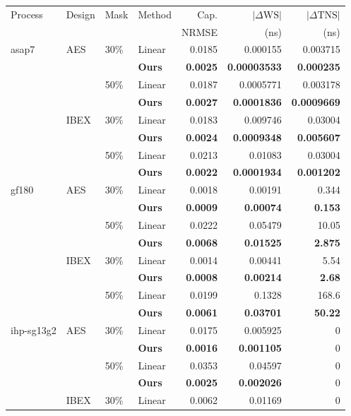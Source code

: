 \footnotesize
\setlength{\tabcolsep}{1.5pt}
\renewcommand{\arraystretch}{0.98}
\begin{tabular*}{\linewidth}{@{\extracolsep{\fill}}llllrrr@{}}\toprule
Process & Design & Mask & Method & Cap.  & $|\Delta\mathrm{WS}|$ & $|\Delta\mathrm{TNS}|$ \\
 & & & & NRMSE & (ns) & (ns) \\
\midrule
asap7 & AES & 30\% & Linear & 0.0185 & 0.000155 & 0.003715 \\
 &  &  & \textbf{Ours} & \textbf{0.0025} & \textbf{0.00003533} & \textbf{0.000235} \\
 &  & 50\% & Linear & 0.0187 & 0.0005771 & 0.003178 \\
 &  &  & \textbf{Ours} & \textbf{0.0027} & \textbf{0.0001836} & \textbf{0.0009669} \\
 & IBEX & 30\% & Linear & 0.0183 & 0.009746 & 0.03004 \\
 &  &  & \textbf{Ours} & \textbf{0.0024} & \textbf{0.0009348} & \textbf{0.005607} \\
 &  & 50\% & Linear & 0.0213 & 0.01083 & 0.03004 \\
 &  &  & \textbf{Ours} & \textbf{0.0022} & \textbf{0.0001934} & \textbf{0.001202} \\
\midrule
gf180 & AES & 30\% & Linear & 0.0018 & 0.00191 & 0.344 \\
 &  &  & \textbf{Ours} & \textbf{0.0009} & \textbf{0.00074} & \textbf{0.153} \\
 &  & 50\% & Linear & 0.0222 & 0.05479 & 10.05 \\
 &  &  & \textbf{Ours} & \textbf{0.0068} & \textbf{0.01525} & \textbf{2.875} \\
 & IBEX & 30\% & Linear & 0.0014 & 0.00441 & 5.54 \\
 &  &  & \textbf{Ours} & \textbf{0.0008} & \textbf{0.00214} & \textbf{2.68} \\
 &  & 50\% & Linear & 0.0199 & 0.1328 & 168.6 \\
 &  &  & \textbf{Ours} & \textbf{0.0061} & \textbf{0.03701} & \textbf{50.22} \\
\midrule
ihp-sg13g2 & AES & 30\% & Linear & 0.0175 & 0.005925 & 0 \\
 &  &  & \textbf{Ours} & \textbf{0.0016} & \textbf{0.001105} & 0 \\
 &  & 50\% & Linear & 0.0353 & 0.04597 & 0 \\
 &  &  & \textbf{Ours} & \textbf{0.0025} & \textbf{0.002026} & 0 \\
 & IBEX & 30\% & Linear & 0.0062 & 0.01169 & 0 \\

\end{tabular*}

